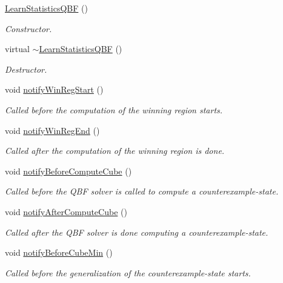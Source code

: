 \begin{DoxyCompactItemize}
\item 
\hyperlink{classLearnStatisticsQBF_a9e98cf8a5d7507e3d2a6026f1369e383}{Learn\-Statistics\-Q\-B\-F} ()
\begin{DoxyCompactList}\small\item\em Constructor. \end{DoxyCompactList}\item 
virtual \hyperlink{classLearnStatisticsQBF_a1827c8e599f8c3f74186fd3a5fa250c4}{$\sim$\-Learn\-Statistics\-Q\-B\-F} ()
\begin{DoxyCompactList}\small\item\em Destructor. \end{DoxyCompactList}\item 
void \hyperlink{classLearnStatisticsQBF_a89cb7bd50255ee97dc040c4a48439dea}{notify\-Win\-Reg\-Start} ()
\begin{DoxyCompactList}\small\item\em Called before the computation of the winning region starts. \end{DoxyCompactList}\item 
void \hyperlink{classLearnStatisticsQBF_afa94736042d6e23e3042517d8db00a50}{notify\-Win\-Reg\-End} ()
\begin{DoxyCompactList}\small\item\em Called after the computation of the winning region is done. \end{DoxyCompactList}\item 
void \hyperlink{classLearnStatisticsQBF_a6aff1d90b24d33dccf27af13f9376ee1}{notify\-Before\-Compute\-Cube} ()
\begin{DoxyCompactList}\small\item\em Called before the Q\-B\-F solver is called to compute a counterexample-\/state. \end{DoxyCompactList}\item 
void \hyperlink{classLearnStatisticsQBF_acb35168104b3c8d3d529c93967c8ebbc}{notify\-After\-Compute\-Cube} ()
\begin{DoxyCompactList}\small\item\em Called after the Q\-B\-F solver is done computing a counterexample-\/state. \end{DoxyCompactList}\item 
void \hyperlink{classLearnStatisticsQBF_a423645758d7dc73103dc27c36544432e}{notify\-Before\-Cube\-Min} ()
\begin{DoxyCompactList}\small\item\em Called before the generalization of the counterexample-\/state starts. \end{DoxyCompactList}\item 

\end{DoxyCompactItemize}
